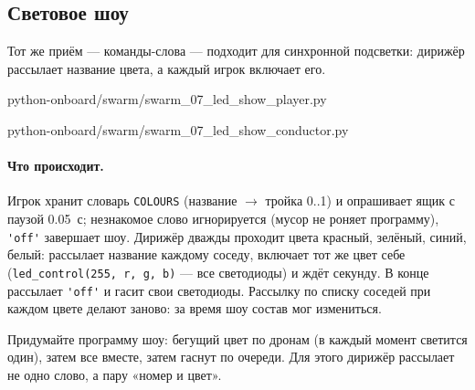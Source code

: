 \subsection{Световое шоу}

Тот же приём --- команды-слова --- подходит для синхронной подсветки: дирижёр рассылает название цвета, а каждый игрок включает его.

\begin{codefile}[python]{python-onboard/swarm/swarm_07_led_show_player.py}
\end{codefile}

\begin{codefile}[python]{python-onboard/swarm/swarm_07_led_show_conductor.py}
\end{codefile}

\paragraph{Что происходит.} Игрок хранит словарь \verb|COLOURS| (название $\to$ тройка 0..1) и опрашивает ящик с паузой 0.05~с; незнакомое слово игнорируется (мусор не роняет программу), \verb|'off'| завершает шоу. Дирижёр дважды проходит цвета красный, зелёный, синий, белый: рассылает название каждому соседу, включает тот же цвет себе (\verb|led_control(255, r, g, b)| --- все светодиоды) и ждёт секунду. В конце рассылает \verb|'off'| и гасит свои светодиоды. Рассылку по списку соседей при каждом цвете делают заново: за время шоу состав мог измениться.

\begin{taskbox}
Придумайте программу шоу: бегущий цвет по дронам (в каждый момент светится один), затем все вместе, затем гаснут по очереди. Для этого дирижёр рассылает не одно слово, а пару «номер и цвет».
\end{taskbox}
